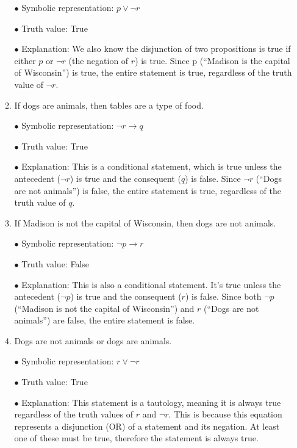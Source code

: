 \documentclass{article}
\begin{document}
\begin{enumerate}
\begin{enumerate}
                        $\bullet$ Symbolic representation: $p \vee \neg r$

                        $\bullet$ Truth value: True

                        $\bullet$ Explanation: We also know the disjunction of two propositions is true if either $p$ or $\neg r$ (the negation of $r$) is true. Since p (``Madison is the capital of Wisconsin'') is true, the entire statement is true, regardless of the truth value of $\neg r$.

                  \item If dogs are animals, then tables are a type of food.

                        $\bullet$ Symbolic representation: $\neg r \rightarrow q$

                        $\bullet$ Truth value: True

                        $\bullet$ Explanation: This is a conditional statement, which is true unless the antecedent ($\neg r$) is true and the consequent ($q$) is false. Since $\neg r$ (``Dogs are not animals'') is false, the entire statement is true, regardless of the truth value of $q$.

                  \item If Madison is not the capital of Wisconsin, then dogs are not animals.

                        $\bullet$ Symbolic representation: $\neg p \rightarrow r$

                        $\bullet$ Truth value: False

                        $\bullet$ Explanation: This is also a conditional statement. It's true unless the antecedent ($\neg p$) is true and the consequent ($r$) is false. Since both $\neg p$ (``Madison is not the capital of Wisconsin'') and $r$ (``Dogs are not animals'') are false, the entire statement is false.

                  \item Dogs are not animals or dogs are animals.

                        $\bullet$ Symbolic representation: $r \vee \neg r$

                        $\bullet$ Truth value: True

                        $\bullet$ Explanation: This statement is a tautology, meaning it is always true regardless of the truth values of $r$ and $\neg r$. This is because this equation represents a disjunction (OR) of a statement and its negation. At least one of these must be true, therefore the statement is always true.


\end{enumerate}
\end{enumerate}
\end{document}
